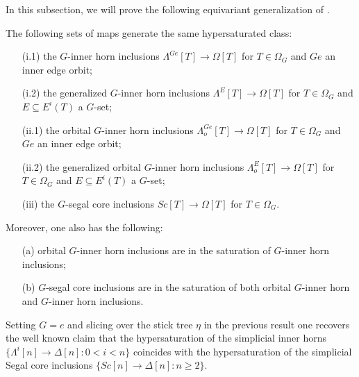 \documentclass[a4paper,10pt,draft]{article}%
\begin{document}
In this subsection, we will prove the following equivariant generalization of \cite[Props. 2.4 and 2.5]{CM13a}.

\begin{proposition}
      The following sets of maps generate the same hypersaturated class:
      \begin{enumerate}
      \item[(i.1)] the $G$-inner horn inclusions
            $\Lambda^{Ge} [T] \to \Omega[T]$ for $T \in \Omega_G$ and $Ge$ an inner edge orbit;
      \item[(i.2)] the generalized $G$-inner horn inclusions
            $\Lambda^{E} [T] \to \Omega[T]$ for $T \in \Omega_G$ and $E \subseteq E^i(T)$ a $G$-set;
      \item[(ii.1)] the orbital $G$-inner horn inclusions
            $\Lambda^{Ge}_o [T] \to \Omega[T]$ for $T \in \Omega_G$ and $Ge$ an inner edge orbit;
      \item[(ii.2)] the generalized orbital $G$-inner horn inclusions
            $\Lambda^{E}_o [T] \to \Omega[T]$ for $T \in \Omega_G$ and $E \subseteq E^i(T)$ a $G$-set;
      \item[(iii)] the $G$-segal core inclusions
            $Sc [T] \to \Omega[T]$ for $T \in \Omega_G$.
      \end{enumerate}
      Moreover, one also has the following:
      \begin{itemize}
      \item[(a)] orbital $G$-inner horn inclusions are in the saturation of $G$-inner horn inclusions;
      \item[(b)] $G$-segal core inclusions are in the saturation of both orbital $G$-inner horn and $G$-inner horn inclusions.
      \end{itemize}
\end{proposition}


\begin{remark}
	Setting $G=e$ and slicing over the stick tree $\eta$ in the previous result
	one recovers the well known claim that 
	the hypersaturation of the simplicial inner horns
	$\{\Lambda^i[n] \to \Delta[n] \colon 0< i < n\}$
	coincides with the hypersaturation of the simplicial Segal core inclusions
	$\{Sc[n] \to \Delta[n]\colon n \geq 2\}$.
\end{remark}
\end{document}
